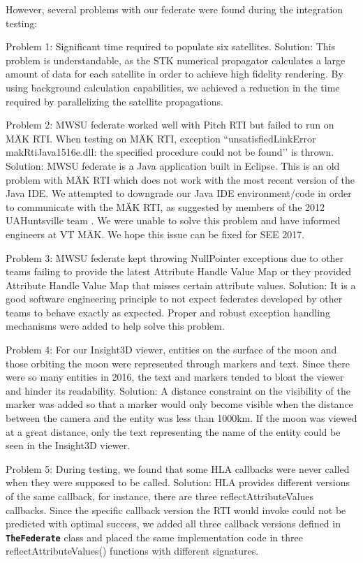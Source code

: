 \documentclass[conference]{IEEEtran}
\newcommand\uml[1]{\texttt{\textbf{#1}}}
\begin{document}
However, several problems with our federate were found during the integration testing:

Problem 1: Significant time required to populate six satellites.
Solution: This problem is understandable, as the STK numerical propagator calculates a large amount of data for each satellite in order to achieve high fidelity rendering.  By using background calculation capabilities, we achieved a reduction in the time required by parallelizing the satellite propagations.

Problem 2: MWSU federate worked well with Pitch RTI but failed to run on M{\"A}K RTI. When testing on M{\"A}K RTI, exception ``unsatisfiedLinkError makRtiJava1516e.dll: the specified procedure could not be found\rq\rq{} is thrown.
Solution: MWSU federate is a Java application built in Eclipse. This is an old problem with M{\"A}K RTI which does not work with the most recent version of the Java IDE. We attempted to downgrade our Java IDE environment/code in order to communicate with the M{\"A}K RTI, as suggested by members of the 2012 UAHuntsville team \cite{bulgatz2012design}. We were unable to solve this problem and have informed engineers at VT M{\"A}K. We hope this issue can be fixed for SEE 2017.

Problem 3: MWSU federate kept throwing NullPointer exceptions due to other teams failing to provide the latest Attribute Handle Value Map or they provided Attribute Handle Value Map that misses certain attribute values.
Solution: It is a good software engineering principle to not expect federates developed by other teams to behave exactly as expected. Proper and robust exception handling mechanisms were added to help solve this problem.

Problem 4: For our Insight3D viewer, entities on the surface of the moon and those orbiting the moon were represented through markers and text. Since there were so many entities in 2016, the text and markers tended to bloat the viewer and hinder its readability.
Solution: A distance constraint on the visibility of the marker was added so that a marker would only become visible when the distance between the camera and the entity was less than 1000km. If the moon was viewed at a great distance, only the text representing the name of the entity could be seen in the Insight3D viewer.

Problem 5: During testing, we found that some HLA callbacks were never called when they were supposed to be called.
Solution: HLA provides different versions of the same callback, for instance, there are three reflectAttributeValues callbacks. Since the specific callback version the RTI would invoke could not be predicted with optimal success, we added all three callback versions defined in \uml{TheFederate} class and placed the same implementation code in three reflectAttributeValues() functions with different signatures.
 
\end{document}
